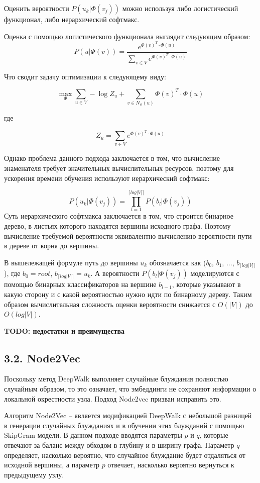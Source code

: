 Оценить вероятности $P(u_k | \Phi(v_j))$  можно используя либо логистический функционал, либо иерархический софтмакс. 

Оценка с помощью логистического функционала выглядит следующим образом:
$$P(u | \Phi(v)) = \frac{e^{\Phi(v)^T \cdot \Phi(u)}}{\sum_{v \in V} e^{\Phi(v)^T \cdot \Phi(u)}}$$

Что сводит задачу оптимизации к следующему виду:

$$
\max_{\Phi} \sum_{u \in V} -\log Z_u + \sum_{v \in N_w(u)} \Phi(v)^T \cdot \Phi(u)
$$

где 

\begin{equation} \label{Z_u}
Z_u = \sum_{v \in V} e^{ \Phi(v)^T \cdot \Phi(u)}
\end{equation}

Однако проблема данного подхода заключается в том, что вычисление знаменателя требует значительных вычислительных ресурсов, поэтому для ускорения времени обучения используют иерархический софтмакс:

$$P(u_k | \Phi(v_j)) = \prod_{l=1}^{\lceil log|V| \rceil} P(b_l | \Phi(v_j))$$
Суть иерархического софтмакса заключается в том, что строится бинарное дерево, в листьях которого находятся вершины исходного графа. Поэтому вычисление требуемой вероятности эквивалентно вычислению вероятности пути в дереве от корня до вершины. 

В вышележащей формуле путь до вершины $u_k$ обозначается как ($b_0$, $b_1$, $...$, $b_{\lceil log|V| \rceil}$), где $b_0 = root$, $b_{\lceil log|V| \rceil} = u_k$. А вероятности $P(b_l | \Phi(v_j))$ моделируются с помощью бинарных классификаторов на вершине $b_{l-1}$, которые указывают в какую сторону и с какой вероятностью нужно идти по бинарному дереву. Таким образом вычислительная сложность оценки вероятности снижается с $O(|V |)$ до $O(log |V |)$.

\textbf{TODO: недостатки и преимущества}

\subsection{3.2. Node2Vec}

Поскольку метод DeepWalk выполняет случайные блуждания полностью случайным образом, то это означает, что эмбеддинги не сохраняют информации о локальной окрестности узла. Подход Node2vec призван исправить это.

Алгоритм Node2Vec \cite{Node2Vec} -- является модификацией DeepWalk с небольшой разницей в генерации случайных блужданиях и в обучении этих блужданий с помощью SkipGram модели. В данном подходе вводятся параметры $p$ и $q$, которые отвечают за баланс между обходом в глубину и в ширину графа. Параметр $q$ определяет, насколько вероятно, что случайное блуждание будет отдаляться от исходной вершины, а параметр $p$ отвечает, насколько вероятно вернуться к предыдущему узлу.

